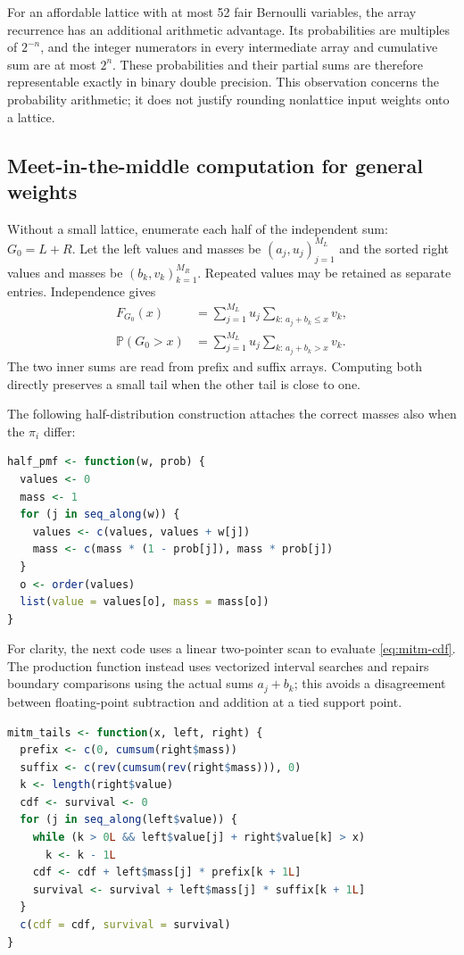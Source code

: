 \documentclass[11pt,letterpaper]{article}
\numberwithin{equation}{section}
\theoremstyle{definition}
\theoremstyle{remark}
\begin{document}
For an affordable lattice with at most 52 fair Bernoulli variables, the
array recurrence has an additional arithmetic advantage. Its probabilities are
multiples of $2^{-n}$, and the integer numerators in every intermediate
array and cumulative sum are at most $2^n$.  These probabilities and their
partial sums are therefore representable exactly in binary double
precision.  This observation concerns the probability arithmetic; it
does not justify rounding nonlattice input weights onto a lattice.

\subsection{Meet-in-the-middle computation for general weights}

Without a small lattice, enumerate each half of the independent sum:
$G_0=L+R$.  Let the left values and masses be $(a_j,u_j)_{j=1}^{M_L}$
and the sorted right values and masses be $(b_k,v_k)_{k=1}^{M_R}$.
Repeated values may be retained as separate entries.  Independence gives
\begin{equation}
 \begin{split}
 F_{G_0}(x)
 &=\sum_{j=1}^{M_L}u_j\sum_{k:\,a_j+b_k\le x}v_k,\\
 \mathbb P(G_0>x)
 &=\sum_{j=1}^{M_L}u_j\sum_{k:\,a_j+b_k>x}v_k.
 \end{split}
 \label{eq:mitm-cdf}
\end{equation}
The two inner sums are read from prefix and suffix arrays.  Computing
both directly preserves a small tail when the other tail is close to one.

The following half-distribution construction attaches the correct masses
also when the $\pi_i$ differ:
\begin{lstlisting}[language=R]
half_pmf <- function(w, prob) {
  values <- 0
  mass <- 1
  for (j in seq_along(w)) {
    values <- c(values, values + w[j])
    mass <- c(mass * (1 - prob[j]), mass * prob[j])
  }
  o <- order(values)
  list(value = values[o], mass = mass[o])
}
\end{lstlisting}

For clarity, the next code uses a linear two-pointer scan to evaluate
\eqref{eq:mitm-cdf}.  The production function instead uses vectorized
interval searches and repairs boundary comparisons using the actual sums
$a_j+b_k$; this avoids a disagreement between floating-point subtraction
and addition at a tied support point.
\begin{lstlisting}[language=R]
mitm_tails <- function(x, left, right) {
  prefix <- c(0, cumsum(right$mass))
  suffix <- c(rev(cumsum(rev(right$mass))), 0)
  k <- length(right$value)
  cdf <- survival <- 0
  for (j in seq_along(left$value)) {
    while (k > 0L && left$value[j] + right$value[k] > x)
      k <- k - 1L
    cdf <- cdf + left$mass[j] * prefix[k + 1L]
    survival <- survival + left$mass[j] * suffix[k + 1L]
  }
  c(cdf = cdf, survival = survival)
}
\end{lstlisting}
\end{document}
